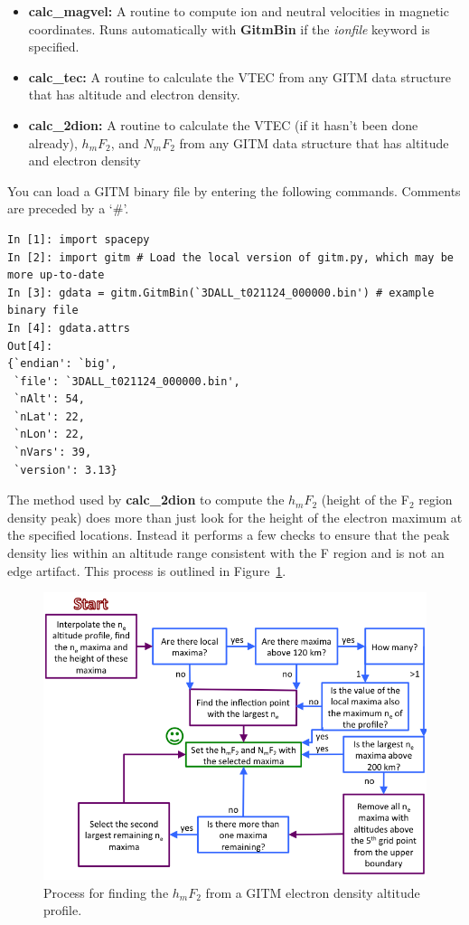 \begin{itemize}
\begin{itemize}
	\item[]{\bf calc\_magvel: } A routine to compute ion and neutral velocities in magnetic coordinates.  Runs automatically with {\bf GitmBin} if the \textit{ionfile} keyword is specified.
	\item[]{\bf calc\_tec: } A routine to calculate the VTEC from any GITM data structure that has altitude and electron density.
	\item[]{\bf calc\_2dion: } A routine to calculate the VTEC (if it hasn't been done already), $h_mF_2$, and $N_mF_2$ from any GITM data structure that has altitude and electron density
	\end{itemize}
\end{itemize}

You can load a GITM binary file by entering the following commands.  Comments are preceded by a `\#'.

\begin{verbatim}
In [1]: import spacepy
In [2]: import gitm # Load the local version of gitm.py, which may be more up-to-date
In [3]: gdata = gitm.GitmBin(`3DALL_t021124_000000.bin') # example binary file
In [4]: gdata.attrs
Out[4]:
{`endian': `big',
 `file': `3DALL_t021124_000000.bin',
 `nAlt': 54,
 `nLat': 22,
 `nLon': 22,
 `nVars': 39,
 `version': 3.13}
\end{verbatim}

The method used by {\bf calc\_2dion} to compute the $h_mF_2$ (height of the F$_2$ region density peak) does more than just look for the height of the electron maximum at the specified locations.  Instead it performs a few checks to ensure that the peak density lies within an altitude range consistent with the F region and is not an edge artifact.  This process is outlined in Figure~\ref{hmf2_flowchart.fig}.

\begin{figure}
\begin{center}
\noindent\includegraphics[width=\textwidth]{Figures/determining_hmF2_flowchart.png}
\caption{Process for finding the $h_mF_2$ from a GITM electron density altitude profile.}
\label{gitm_3D_global_plots.fig}
\end{center}
\label{hmf2_flowchart.fig}
\end{figure}

